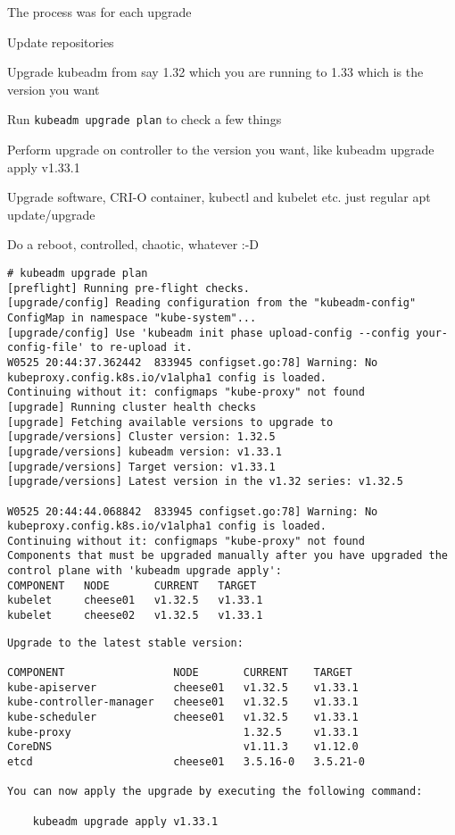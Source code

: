 \documentclass[Screen16to9,17pt]{foils}
\begin{document}
The process was for each upgrade
\begin{list2}
\item Update repositories
\item Upgrade kubeadm from say 1.32 which you are running to 1.33 which is the version you want
\item Run \verb+kubeadm upgrade plan+ to check a few things
\item Perform upgrade on controller to the version you want, like kubeadm upgrade apply v1.33.1
\item Upgrade software, CRI-O container, kubectl and kubelet etc. just regular apt update/upgrade
\item Do a reboot, controlled, chaotic, whatever :-D
\end{list2}


\begin{verbatim}
# kubeadm upgrade plan
[preflight] Running pre-flight checks.
[upgrade/config] Reading configuration from the "kubeadm-config" ConfigMap in namespace "kube-system"...
[upgrade/config] Use 'kubeadm init phase upload-config --config your-config-file' to re-upload it.
W0525 20:44:37.362442  833945 configset.go:78] Warning: No kubeproxy.config.k8s.io/v1alpha1 config is loaded.
Continuing without it: configmaps "kube-proxy" not found
[upgrade] Running cluster health checks
[upgrade] Fetching available versions to upgrade to
[upgrade/versions] Cluster version: 1.32.5
[upgrade/versions] kubeadm version: v1.33.1
[upgrade/versions] Target version: v1.33.1
[upgrade/versions] Latest version in the v1.32 series: v1.32.5

W0525 20:44:44.068842  833945 configset.go:78] Warning: No kubeproxy.config.k8s.io/v1alpha1 config is loaded.
Continuing without it: configmaps "kube-proxy" not found
Components that must be upgraded manually after you have upgraded the control plane with 'kubeadm upgrade apply':
COMPONENT   NODE       CURRENT   TARGET
kubelet     cheese01   v1.32.5   v1.33.1
kubelet     cheese02   v1.32.5   v1.33.1
\end{verbatim}


\begin{verbatim}
Upgrade to the latest stable version:

COMPONENT                 NODE       CURRENT    TARGET
kube-apiserver            cheese01   v1.32.5    v1.33.1
kube-controller-manager   cheese01   v1.32.5    v1.33.1
kube-scheduler            cheese01   v1.32.5    v1.33.1
kube-proxy                           1.32.5     v1.33.1
CoreDNS                              v1.11.3    v1.12.0
etcd                      cheese01   3.5.16-0   3.5.21-0

You can now apply the upgrade by executing the following command:

	kubeadm upgrade apply v1.33.1
\end{verbatim}
\end{document}
